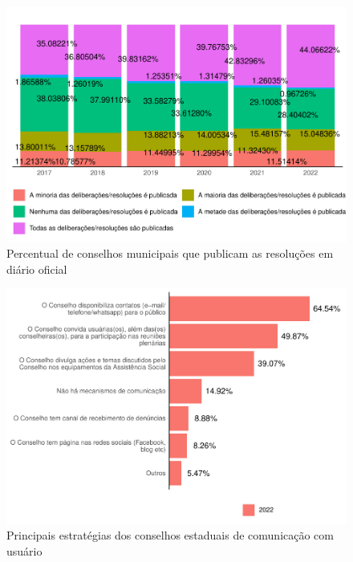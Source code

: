 \documentclass[
  brazilian]{report}
\begin{document}
\begin{figure}
\includegraphics{Censo-SUAS-2022_files/figure-latex/pub_cmas-1} \caption[Percentual de conselhos municipais que publicam as resoluções em diário oficial]{Percentual de conselhos municipais que publicam as resoluções em diário oficial}\label{fig:pub_cmas}
\end{figure}

\begin{figure}
\includegraphics{Censo-SUAS-2022_files/figure-latex/cmun_usu-1} \caption[Principais estratégias dos conselhos estaduais de comunicação com usuário]{Principais estratégias dos conselhos estaduais de comunicação com usuário}\label{fig:cmun_usu}
\end{figure}
\end{document}
